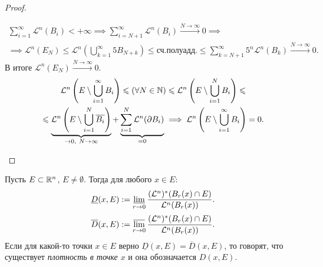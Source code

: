 \begin{proof}
\begin{enumerate}
        \begin{multline*}
            \sum\limits_{i=1}^{\infty} \mathcal{L}^n(B_i) < + \infty
            \implies
            \sum\limits_{i=N+1}^{\infty} \mathcal{L}^n(B_i) \xrightarrow{N \to \infty} 0
            \implies\\\implies
            \mathcal{L}^n(E_N) \leqslant \mathcal{L}^n \left(\bigcup\limits_{k=1}^{\infty} 5B_{N+k}\right) \leqslant \text{сч.полуадд.} \leqslant
            \sum\limits_{k=N+1}^{\infty} 5^n \mathcal{L}^n(B_k) \xrightarrow{N \to \infty} 0.
        \end{multline*} 
        В итоге $\mathcal{L}^n(E_N) \xrightarrow{N \to \infty} 0$.
        \begin{multline*}
            \mathcal{L}^n \left(E \setminus \bigcup\limits_{i=1}^{\infty} B_i\right) 
            \leqslant (\forall N \in \mathbb{N}) \leqslant
            \mathcal{L}^n \left(E \setminus \bigcup\limits_{i=1}^{N} B_i\right) 
            \leqslant\\\leqslant
            \underbrace{\mathcal{L}^n \left(E \setminus \bigcup\limits_{i=1}^{N} \overline{B_i}\right)}_{\to 0,\ N \to \infty} + \underbrace{\sum\limits_{i=1}^{N} \mathcal{L}^n (\partial B_i)}_{=0}
            \implies \mathcal{L}^n \left(E \setminus \bigcup\limits_{i=1}^{\infty}B_i\right) = 0.
        \end{multline*} 
    \end{enumerate}
\end{proof} 

\begin{definition}
    Пусть $E \subset \mathbb{R}^n$, $E \neq \emptyset$.
    Тогда для любого $x \in E$:
    \[\underline{D}(x,E) := \operatorname*{\underline{lim}}\limits_{r \to 0} \frac{(\mathcal{L}^n)^*(B_r(x) \cap E)}{\mathcal{L}^n(B_r(x))}.\]
    \[\overline{D}(x,E) := \operatorname*{\overline{lim}}\limits_{r \to 0} \frac{(\mathcal{L}^n)^*(B_r(x) \cap E)}{\mathcal{L}^n(B_r(x))}.\]
    Если для какой-то точки $x \in E$ верно $\underline{D}(x,E) = \overline{D}(x,E)$, то говорят, что существует \textit{плотность в точке $x$} и она обозначается $D(x,E)$.
\end{definition} 

